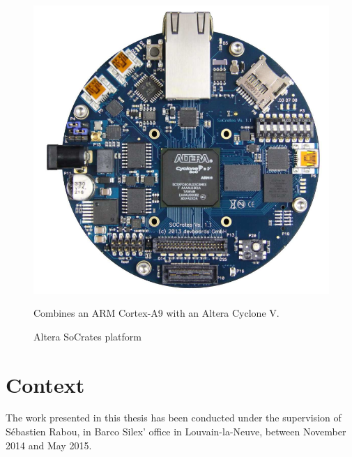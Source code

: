 

\begin{figure}[ht]
\includegraphics[width=\linewidth]{socrates-photo}
\caption{Altera SoCrates platform}{Combines an ARM Cortex-A9 with an Altera Cyclone V.}
\label{socrates-photo}
\end{figure}





\section{Context}
The work presented in this thesis has been conducted under the supervision of Sébastien Rabou, in Barco Silex' office in Louvain-la-Neuve, between November 2014 and May 2015.\newline{}



